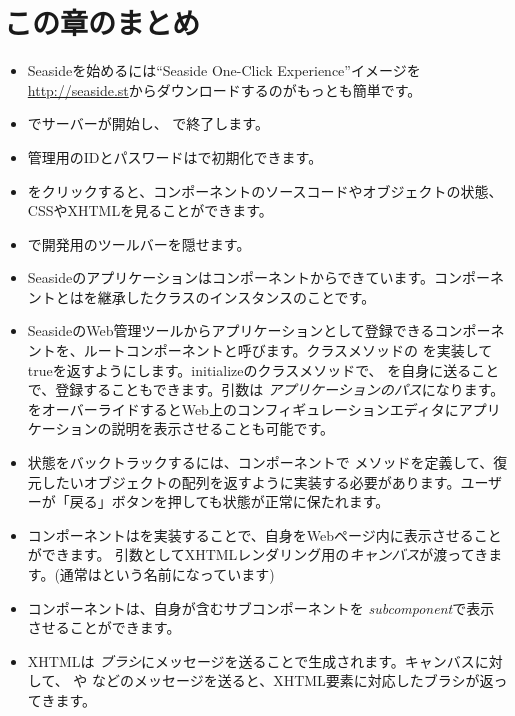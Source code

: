 \documentclass[a4paper,10pt,twoside]{book}
\begin{document}
\section{この章のまとめ}


\begin{itemize}
  \item Seasideを始めるには``Seaside One-Click Experience''イメージを \url{http://seaside.st}からダウンロードするのがもっとも簡単です。
  \item {} でサーバーが開始し、 で終了します。
  \item 管理用のIDとパスワードはで初期化できます。
  \item {} をクリックすると、コンポーネントのソースコードやオブジェクトの状態、CSSやXHTMLを見ることができます。
  \item {} で開発用のツールバーを隠せます。
  \item Seasideのアプリケーションはコンポーネントからできています。コンポーネントとはを継承したクラスのインスタンスのことです。
  \item SeasideのWeb管理ツールからアプリケーションとして登録できるコンポーネントを、ルートコンポーネントと呼びます。クラスメソッドの  を実装してtrueを返すようにします。initializeのクラスメソッドで、  を自身に送ることで、登録することもできます。引数は \emph{アプリケーションのパス}になります。
     をオーバーライドするとWeb上のコンフィギュレーションエディタにアプリケーションの説明を表示させることも可能です。
  \item 状態をバックトラックするには、コンポーネントで  メソッドを定義して、復元したいオブジェクトの配列を返すように実装する必要があります。ユーザーが「戻る」ボタンを押しても状態が正常に保たれます。
  \item コンポーネントはを実装することで、自身をWebページ内に表示させることができます。
    引数としてXHTMLレンダリング用の\emph{キャンバス}が渡ってきます。(通常はという名前になっています)
  \item コンポーネントは、自身が含むサブコンポーネントを  \emph{subcomponent}で表示させることができます。
  \item XHTMLは \emph{ブラシ}にメッセージを送ることで生成されます。キャンバスに対して、  や などのメッセージを送ると、XHTML要素に対応したブラシが返ってきます。

\end{itemize}
\end{document}
